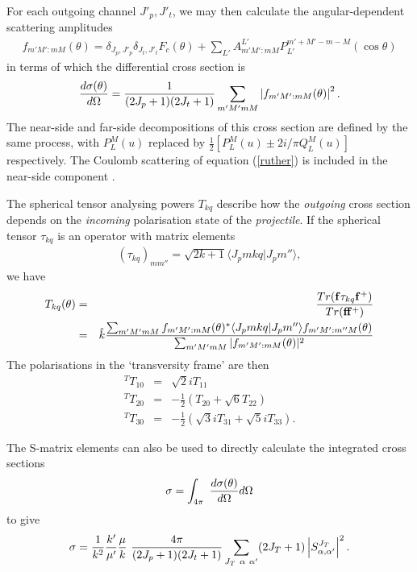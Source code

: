 \documentclass[11pt,a4paper]{article}
\newcommand{\half}{\frac{1}{2}}
\begin{document}
For each outgoing channel $J'_ p , J'_ t $,
we may then calculate the angular-dependent scattering amplitudes
\begin{eqnarray}
f_{m' M' : mM} (\theta) =
    \delta_{J_p , J'_ p}
    \delta_{J_t , J'_ t}
     F_c (\theta) +
  \sum_{L'} A_{m' M' : mM}^{L'}
                    P_{L'}^{m' +M' -m-M} (\cos \theta)
\end{eqnarray}
in terms of which the differential cross section is
\begin{eqnarray}
  {d \sigma(\theta) \over d \Omega} =
   {1 \over (2J_p + 1)(2J_t + 1) }
   \sum_{m' M' m M}
           \left | f_{m' M' : mM} (\theta) \right | ^2 .
\end{eqnarray}
The near-side and far-side decompositions \cite{berry66}
of this cross section are
defined by the same process, with $P^M_L (u)$ replaced by
$\half [P^M_L (u)\pm 2i / \pi  Q^M_L (u)]$ respectively.
The Coulomb scattering of equation (\ref{ruther}) is included
in the near-side component \cite{row78}.

The spherical tensor analysing powers $T_{kq}$
describe how the {\em outgoing}
cross section depends on the {\em incoming}
polarisation state of the {\em projectile}.
If the spherical tensor $\tau_{kq}$
is an operator with matrix elements
\begin{eqnarray} \nonumber
(\tau_{kq})_{m m''} =
  \sqrt{2k+1}\langle J_p m k q | J_p m''\rangle,
\end{eqnarray}
we have
\begin{eqnarray}
T_{kq} (\theta)
             &=& {Tr ({\bf f} \tau_{kq} {\bf f}^+)} \over
                    {Tr ({\bf f}              {\bf f}^+)}
\\
           &=& \hat{k}
           {   \sum_{m' M'  m  M}
                      f_{m' M' : m M} (\theta)^*
             \langle J_p m  k q | J_p m''\rangle
                      f_{m' M' : m''  M} (\theta)
                    \over
                     \sum_{m' M'  m  M}
                      | f_{m' M' : mM} (\theta) | ^2 }
\end{eqnarray}
The polarisations in the `transversity frame' \cite{simon74}
are then
\begin{eqnarray}
  ^T T_{10} &=& \sqrt 2 i T_{11}
\\
  ^T T_{20}  &=& -\half (T_{20} + \sqrt 6 T_{22})
\\
  ^T T_{30} &=& -\half ( \sqrt 3 i T_{31} + \sqrt 5 i T_{33} ) .
\end{eqnarray}

The S-matrix elements can also be used to directly calculate the
integrated cross sections
\begin{eqnarray}
\sigma = \int_ {4 \pi}
           {~ {d \sigma(\theta) \over d \Omega} d \Omega  }
\end{eqnarray}
to give
\begin{eqnarray}
\sigma = {1 \over k^2} {k' \over \mu'} {\mu \over k} ~
        {4 \pi \over (2J_p + 1)(2J_t + 1)}
        \sum_{J_T ~\alpha ~\alpha'}
         (2J_T + 1) \left | S^{J_T}_{\alpha ,\alpha'}
                        \right | ^2 .
\end{eqnarray}
\end{document}
